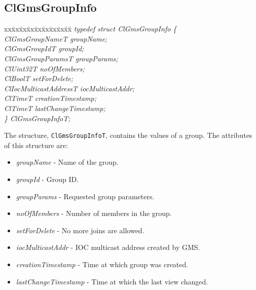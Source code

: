 \begin{flushleft}
\subsection{ClGmsGroupInfo}
\begin{tabbing}
xx\=xx\=xx\=xx\=xx\=xx\=xx\=xx\=xx\=\kill
\textit{typedef struct ClGmsGroupInfo \{}\\
\>\>\>\>\textit{ClGmsGroupNameT     groupName;}\\
\>\>\>\>\textit{ClGmsGroupIdT       groupId;}\\
\>\>\>\>\textit{ClGmsGroupParamsT   groupParams;}\\
\>\>\>\>\textit{ClUint32T           noOfMembers;}\\
\>\>\>\>\textit{ClBoolT             setForDelete;}\\
\>\>\>\>\textit{ClIocMulticastAddressT iocMulticastAddr;}\\
\>\>\>\>\textit{ClTimeT                 creationTimestamp;}\\
\>\>\>\>\textit{ClTimeT                 lastChangeTimestamp;}\\
\textit{\} ClGmsGroupInfoT;}\end{tabbing}
The structure, {\tt{ClGmsGroupInfoT}}, contains the values of a group. The attributes of this structure are:

\begin{itemize}
\item
\textit{groupName} - Name of the group.
\item
\textit{groupId} - Group ID.
\item
\textit{groupParams} - Requested group parameters.
\item
\textit{noOfMembers} - Number of members in the group.
\item
\textit{setForDelete} - No more joins are allowed.
\item
\textit{iocMulticastAddr} - IOC multicast address created by GMS.
\item
\textit{creationTimestamp} - Time at which group was created.
\item
\textit{lastChangeTimestamp} - Time at which the last view changed.
\end{itemize}






\end{flushleft}
